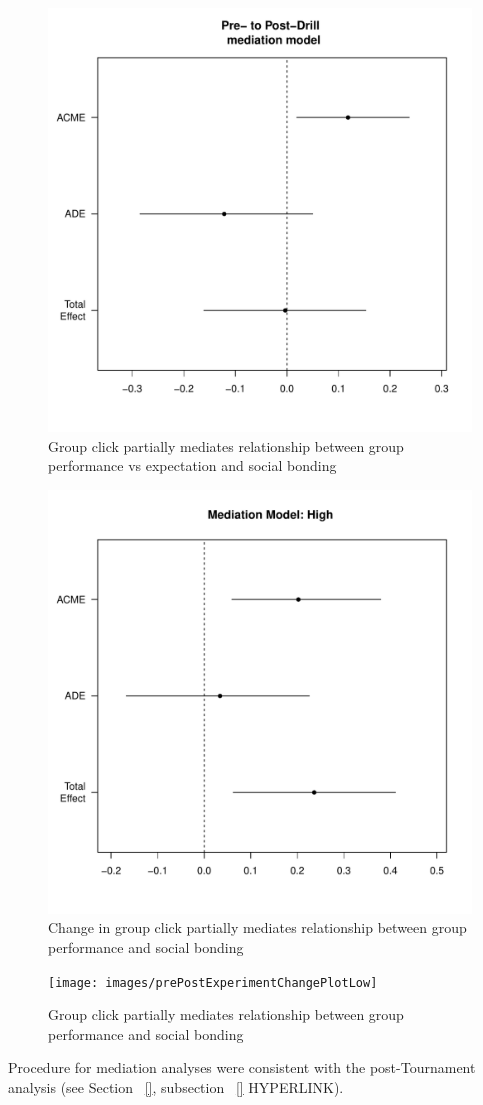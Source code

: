 \begin{figure}
  \centering
  \includegraphics[width=0.5\linewidth,keepaspectratio] {images/groupPerfExpClickChangeMedPlot}
  \caption{Group click partially mediates relationship between group performance vs expectation and social bonding}
  \label{fig:groupPerfExpClickChangeMedPlot}
\end{figure}

\begin{figure}
  \centering
  \includegraphics[width=0.5\linewidth,keepaspectratio] {images/groupPerfClickChangeMedPlotHigh}
  \caption{Change in group click partially mediates relationship between group performance and social bonding}
  \label{fig:groupPerfClickChangeMedPlotHigh}
\end{figure}

\begin{figure}
  \centering
  \texttt{[image: images/prePostExperimentChangePlotLow]}
  \caption{Group click partially mediates relationship between group performance and social bonding}
  \label{fig:prePostExperimentChangePlotLow}
\end{figure}


Procedure for mediation analyses were consistent with the post-Tournament analysis (see Section ~\ref{}, subsection ~\ref{} HYPERLINK).

